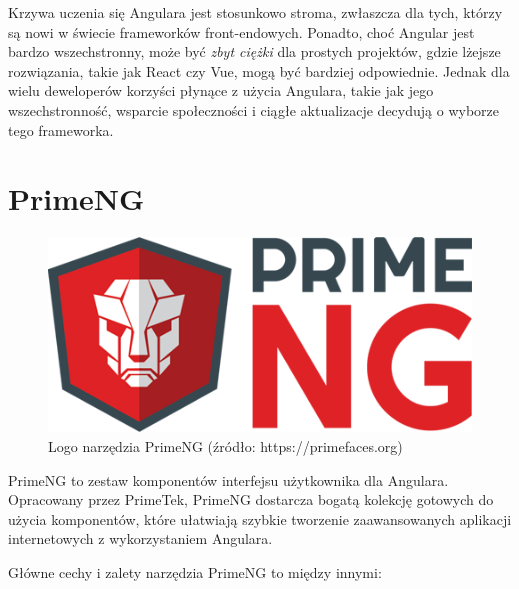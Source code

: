 Krzywa uczenia się Angulara jest stosunkowo stroma, zwłaszcza dla tych, którzy są nowi w świecie frameworków front-endowych. Ponadto, choć Angular jest bardzo wszechstronny, może być \textit{zbyt ciężki} dla prostych projektów, gdzie lżejsze rozwiązania, takie jak React czy Vue, mogą być bardziej odpowiednie. Jednak dla wielu deweloperów korzyści płynące z użycia Angulara, takie jak jego wszechstronność, wsparcie społeczności i ciągłe aktualizacje decydują o wyborze tego frameworka\cite{angularSpecs}.

\section{PrimeNG}
\begin{figure}[h]
    \centering
    \includegraphics[width=0.5\linewidth]{./img/primeng.png}
    \caption{Logo narzędzia PrimeNG (źródło: https://primefaces.org)}
    \label{fig:PrimeNG}
\end{figure}

PrimeNG to zestaw komponentów interfejsu użytkownika dla Angulara. Opracowany przez PrimeTek, PrimeNG dostarcza bogatą kolekcję gotowych do użycia komponentów, które ułatwiają szybkie tworzenie zaawansowanych aplikacji internetowych z wykorzystaniem Angulara.

Główne cechy i zalety narzędzia PrimeNG to między innymi:

